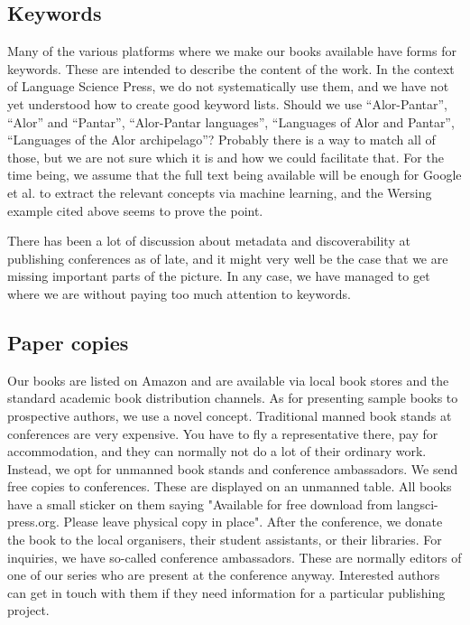 \documentclass[guidelines,nonflat,modfonts] {langsci/langscibook}
\begin{document}
\subsection{Keywords }
Many of the various platforms where we make our books available have forms for keywords. These are intended to describe the content of the work. In the context of Language Science Press, we do not systematically use them, and we have not yet understood how to create good keyword lists. Should we use ``Alor-Pantar'', ``Alor'' and ``Pantar'', ``Alor-Pantar languages'', ``Languages of Alor and Pantar'', ``Languages of the Alor archipelago''? Probably there is a way to match all of those, but we are not sure which it is and how we could facilitate that. For the time being, we assume that the full text being available will be enough for Google et al. to extract the relevant concepts via machine learning, and the Wersing example cited above seems to prove the point. 

There has been a lot of discussion about metadata and discoverability at publishing conferences as of late, and it might very well be the case that we are missing important parts of the picture. In any case, we have managed to get where we are without paying too much attention to keywords. 
                    
\subsection{Paper copies}                    
Our books are listed on Amazon and are available via local book stores and the standard academic book distribution channels. As for presenting sample books to prospective authors, we use a novel concept. Traditional manned book stands at conferences are very expensive. You have to fly a representative there, pay for accommodation, and they can normally not do a lot of their ordinary work. Instead, we opt for unmanned book stands and conference ambassadors. We send free copies to conferences.  These are displayed on an unmanned table. All books have a small sticker on them saying "Available for free download from langsci-press.org. Please leave physical copy in place". After the conference, we donate the book to the local organisers, their student assistants, or their libraries. 
For inquiries, we have so-called conference ambassadors. These are normally editors of one of our series who are present at the conference anyway. Interested authors can get in touch with them if they need information for a particular publishing project. 
                    
\end{document}
